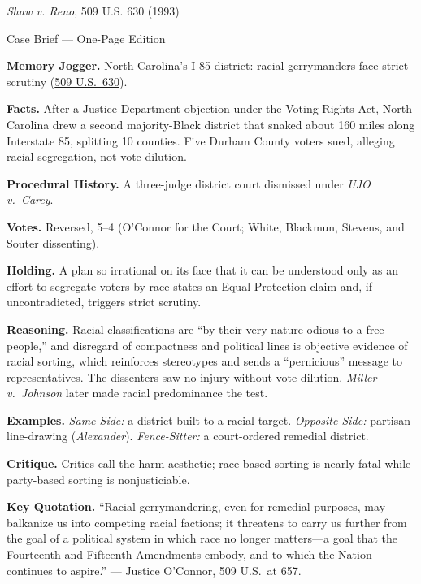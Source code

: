 \documentclass[12pt]{article}
\begin{document}
\begin{center}
{\Large \textit{Shaw v. Reno}, 509 U.S. 630 (1993)\par}
\vspace{0.3em}
{\normalsize Case Brief --- One-Page Edition\par}
\end{center}

\textbf{Memory Jogger.} North Carolina's I-85 district: racial gerrymanders face strict scrutiny (\href{https://supreme.justia.com/cases/federal/us/509/630/}{509 U.S.\ 630}).

\textbf{Facts.} After a Justice Department objection under the Voting Rights Act, North Carolina drew a second majority-Black district that snaked about 160 miles along Interstate 85, splitting 10 counties. Five Durham County voters sued, alleging racial segregation, not vote dilution.

\textbf{Procedural History.} A three-judge district court dismissed under \textit{UJO v.\ Carey}.

\textbf{Votes.} Reversed, 5--4 (O'Connor for the Court; White, Blackmun, Stevens, and Souter dissenting).

\textbf{Holding.} A plan so irrational on its face that it can be understood only as an effort to segregate voters by race states an Equal Protection claim and, if uncontradicted, triggers strict scrutiny.

\textbf{Reasoning.} Racial classifications are ``by their very nature odious to a free people,'' and disregard of compactness and political lines is objective evidence of racial sorting, which reinforces stereotypes and sends a ``pernicious'' message to representatives. The dissenters saw no injury without vote dilution. \textit{Miller v.\ Johnson} later made racial predominance the test.

\textbf{Examples.} \emph{Same-Side:} a district built to a racial target. \emph{Opposite-Side:} partisan line-drawing (\textit{Alexander}). \emph{Fence-Sitter:} a court-ordered remedial district.

\textbf{Critique.} Critics call the harm aesthetic; race-based sorting is nearly fatal while party-based sorting is nonjusticiable.

\textbf{Key Quotation.} ``Racial gerrymandering, even for remedial purposes, may balkanize us into competing racial factions; it threatens to carry us further from the goal of a political system in which race no longer matters---a goal that the Fourteenth and Fifteenth Amendments embody, and to which the Nation continues to aspire.'' --- Justice O'Connor, 509 U.S.\ at 657.
\end{document}
